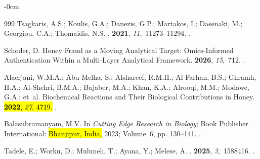 \documentclass[foods,review,accept,pdftex,moreauthors]{Definitions/mdpi}
\begin{document}
{\begin{adjustwidth}{-\extralength}{0cm}
\begin{thebibliography}{999}
Tsagkaris, A.S.;  Koulis, G.A.; Danezis, G.P.; Martakos, I.; Dasenaki, M.; Georgiou, C.A.; Thomaidis, N.S.
.
 {\bf 2021}, {\em 11},~11273--11294.
.

Schoder, D.
\newblock Honey Fraud as a Moving Analytical Target: Omics-Informed
  Authentication Within a Multi-Layer Analytical Framework.
 {\bf 2026}, {\em 15},~712.
.

Alaerjani, W.M.A.; Abu-Melha, S.; Alshareef, R.M.H.; Al-Farhan, B.S.; Ghramh,
  H.A.; Al-Shehri, B.M.A.; Bajaber, M.A.; Khan, K.A.; Alrooqi, M.M.; Modawe,
  G.A.;  et~al.
\newblock Biochemical Reactions and Their Biological Contributions in Honey.
 \hl{\textbf{2022}, \emph{27}, 4719.} 
.

Balasubramanyam, M.V.
 In {\em Cutting Edge Research
  in Biology}; Book Publisher International: \hl{Bhanjipur, India,}  2023; Volume~6, pp. 130--141.
.


Tadele, E.;  Worku, D.; Muluneh, T.; Ayana, Y.; Melese, A.
.
 {\bf 2025}, {\em 3},~1588416.
.


\end{thebibliography}
\end{adjustwidth}}
\end{document}
